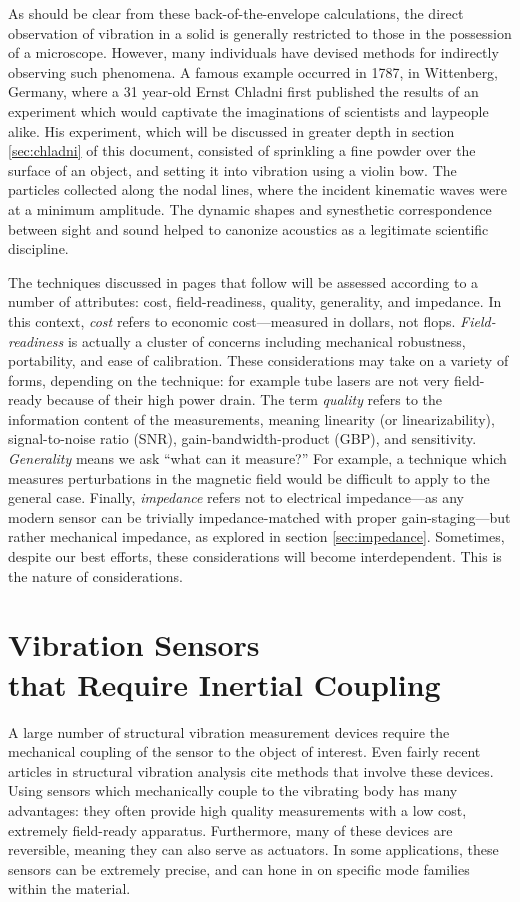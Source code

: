 \documentclass[a4paper,10pt]{report}
\numberwithin{equation}{section}
\begin{document}
As should be clear from these back-of-the-envelope calculations, the direct observation of vibration in a solid is generally restricted to those in the possession of a microscope. However, many individuals have devised methods for indirectly observing such phenomena. A famous example occurred in 1787, in Wittenberg, Germany, where a 31 year-old Ernst Chladni first published the results of an experiment which would captivate the imaginations of scientists and laypeople alike.\cite{Stockmann2007} \cite{Ullmann2007} His experiment, which will be discussed in greater depth in section \ref{sec:chladni} of this document, consisted of sprinkling a fine powder over the surface of an object, and setting it into vibration using a violin bow. The particles collected along the nodal lines, where the incident kinematic waves were at a minimum amplitude. The dynamic shapes and synesthetic correspondence between sight and sound helped to canonize acoustics as a legitimate scientific discipline. 

The techniques discussed in pages that follow will be assessed according to a number of attributes: cost, field-readiness, quality, generality, and impedance. In this context, \emph{cost} refers to economic cost---measured in dollars, not flops. \emph{Field-readiness} is actually a cluster of concerns including mechanical robustness, portability, and ease of calibration. These considerations may take on a variety of forms, depending on the technique: for example tube lasers are not very field-ready because of their high power drain. The term \emph{quality} refers to the information content of the measurements, meaning linearity (or linearizability), signal-to-noise ratio (SNR), gain-bandwidth-product (GBP), and sensitivity. \emph{Generality} means we ask ``what can it measure?'' For example, a technique which measures perturbations in the magnetic field would be difficult to apply to the general case. Finally, \emph{impedance} refers not to electrical impedance---as any modern sensor can be trivially 
impedance-matched with proper gain-staging---but rather mechanical impedance, as explored in section \ref{sec:impedance}. Sometimes, despite our best efforts, these considerations will become interdependent. This is the nature of considerations.

\section{Vibration Sensors \\that Require Inertial Coupling}\label{sec:coupling}
 A large number of structural vibration measurement devices require the mechanical coupling of the sensor to the object of interest. Even fairly recent articles in structural vibration analysis cite methods that involve these devices. \cite{Han2003} \cite{Kerschen2002} Using sensors which mechanically couple to the vibrating body has many advantages: they often provide high quality measurements with a low cost, extremely field-ready apparatus. Furthermore, many of these devices are reversible, meaning they can also serve as actuators. \cite[p.~69]{Cremer1973} In some applications, these sensors can be extremely precise, and can hone in on specific mode families within the material. \cite[p.~36]{Ballantine1997}
\end{document}
